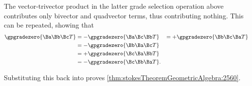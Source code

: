 The vector-trivector product in the latter grade selection operation above contributes only bivector and quadvector terms, thus contributing nothing.  This can be repeated, showing that
\begin{equation}\label{eqn:stokesTheoremGeometricAlgebra:2700}
\begin{aligned}
   \gpgradezero{ \Ba \Bb \Bc T } &= - \gpgradezero{ \Ba \Bc \Bb T } 
   &= + \gpgradezero{ \Bb \Bc \Ba T }  \\
   &= - \gpgradezero{ \Bb \Ba \Bc T }  \\
   &= + \gpgradezero{ \Bc \Ba \Bb T }  \\
   &= - \gpgradezero{ \Bc \Bb \Ba T }.
\end{aligned}
\end{equation}

Substituting this back into  proves \cref{thm:stokesTheoremGeometricAlgebra:2560}.
